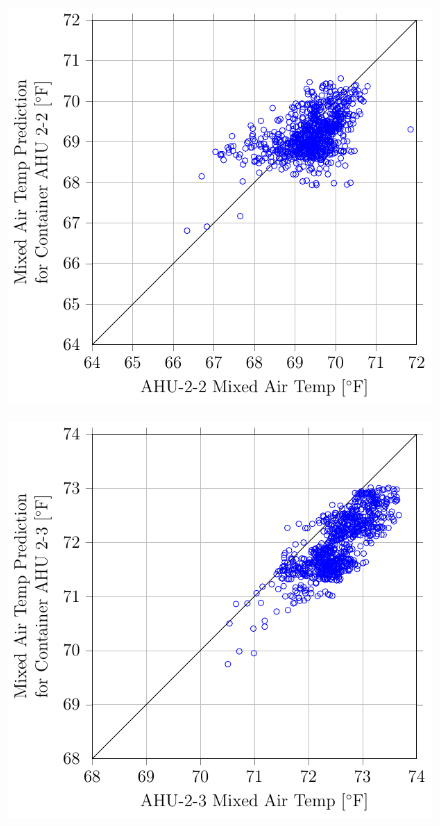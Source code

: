 \begin{figure}
\centering
\includegraphics[]{Plots/2016-09-07-1619-MixedAirTempPredictionforContainerAHU22vsAHU22MixedAirTemp.pdf}
\caption{}
\label{fig:2016-09-07-1619-MixedAirTempPredictionforContainerAHU22vsAHU22MixedAirTemp}
\end{figure}

\begin{figure}
\centering
\includegraphics[]{Plots/2016-09-07-1623-MixedAirTempPredictionforContainerAHU23vsAHU23MixedAirTemp.pdf}
\caption{}
\label{fig:2016-09-07-1623-MixedAirTempPredictionforContainerAHU23vsAHU23MixedAirTemp}
\end{figure}


